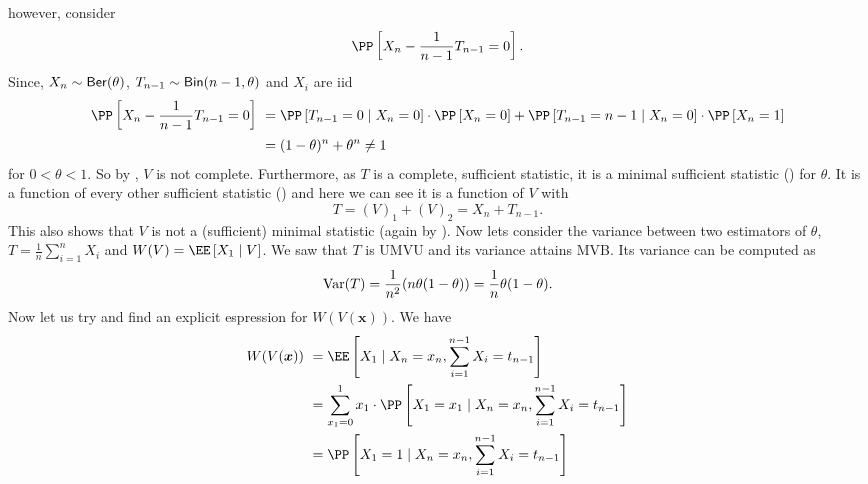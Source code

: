 \begin{exam}
\begin{equation*}
    \end{equation*}
    however, consider
    \begin{align*}
        \PP \left[ X_n - \frac{1}{n-1} T_{n-1} = 0 \right].
    \end{align*}
    Since, $X_n \sim {\sf Ber} (\theta)$, $T_{n-1} \sim {\sf Bin} (n-1, \theta)$ and $X_i$ are iid
    \begin{align*}
        \PP \left[ X_n - \frac{1}{n-1} T_{n-1} = 0 \right] \
         & = \PP \left[ T_{n-1} = 0 \mid X_n = 0 \right] \cdot \PP \left[ X_n = 0 \right] + \PP \left[ T_{n-1} = n-1 \mid X_n = 0 \right] \cdot \PP \left[ X_n = 1 \right] \\
         & = (1 - \theta)^{n} + \theta^{n} \neq 1
    \end{align*}
    for $0 < \theta < 1$. So by , $V$ is not complete. Furthermore, as $T$ is a complete, sufficient statistic, it is a minimal sufficient statistic () for $\theta$. It is a function of every other sufficient statistic () and here we can see it is a function of $V$ with
    \begin{equation*}
        T = (V)_1 + (V)_2 = X_n + T_{n-1}.
    \end{equation*}
    This also shows that $V$ is not a (sufficient) minimal statistic (again by ). Now lets consider the variance between two estimators of $\theta$, $T = \frac{1}{n} \sum_{i=1}^{n} X_i$ and $W(V) = \EE \left[ X_1 \mid V \right]$. We saw that $T$ is UMVU and its variance attains MVB. Its variance can be computed as
    \begin{equation*}
        {\operatorname{Var}} (T) = \frac{1}{n^2} (n \theta (1-\theta)) = \frac{1}{n} \theta (1 - \theta).
    \end{equation*}
    Now let us try and find an explicit espression for $W(V(\bm{x}))$. We have
    \begin{align*}
        W(V(\bm{x})) \
         & = \EE \left[ X_1 \mid X_n = x_n , \sum_{i=1}^{n-1} X_i = t_{n-1} \right]                                                                                                                                  \\
         & = \sum_{x_1 = 0}^{1} x_1 \cdot \PP \left[ X_1 = x_1 \mid X_n = x_n , \sum_{i=1}^{n-1} X_i = t_{n-1} \right]                                                                                               \\
         & = \PP \left[ X_1 = 1 \mid X_n = x_n , \sum_{i=1}^{n-1} X_i = t_{n-1} \right]                                                                                                                              \\

\end{align*}
\end{exam}
